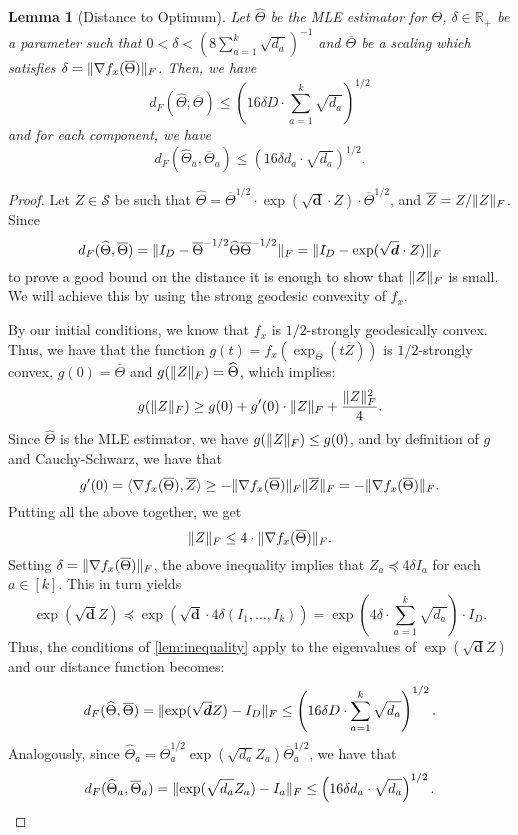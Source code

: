 \documentclass[aos]{imsart}
\newtheorem{lemma}[theorem]{Lemma}
\theoremstyle{definition}
\DeclarePairedDelimiter{\norm}{\lVert}{\rVert}
\newcommand{\R}{{\mathbb{R}}}
\newcommand{\otheta}{\overline{\Theta}}
\newcommand{\htheta}{\widehat{\Theta}}
\newcommand{\oZ}{\overline{Z}}
\renewcommand{\vec}{\bm}
\newcommand{\Sym}{\mathcal{S}}
\begin{document}
\begin{lemma}[Distance to Optimum]\label{lem:tensor-distance-opt}
	Let $\htheta$ be the MLE estimator for $\Theta$, $\delta \in \R_+$ be a parameter such that
	$0 < \delta < \left(8 \sum_{a=1}^k \sqrt{d_a} \right)^{-1}$ and $\otheta$ be a scaling which satisfies $\delta = \norm{\nabla f_x(\otheta)}_F$. Then, we have
	$$ d_F(\htheta; \otheta) \leq \left( 16 \delta D \cdot \sum_{a=1}^k \sqrt{d_a} \right)^{1/2} $$
	and for each component, we have
	$$ d_F(\htheta_a, \otheta_a) \leq \left( 16 \delta d_a \cdot \sqrt{d_a} \right)^{1/2}. $$
\end{lemma}

\begin{proof}
	Let $Z \in \Sym$ be such that $\htheta = \otheta^{1/2} \cdot \exp(\sqrt{\vec d} \cdot Z) \cdot \otheta^{1/2}$, and $\oZ = Z / \norm{Z}_F$.
	Since
	$$ d_F(\htheta, \otheta) = \norm{I_D - \otheta^{-1/2} \htheta \otheta^{-1/2}}_F = \norm{I_D - \exp(\sqrt{\vec d} \cdot Z)}_F $$
	to prove a good bound on the distance it is enough to show that $\norm{Z}_F$ is small.
	We will achieve this by using the strong geodesic convexity of $f_x$.

	By our initial conditions, we know that $f_x$ is $1/2$-strongly geodesically convex.
	Thus, we have that the function $g(t) = f_x(\exp_{\otheta} (t \oZ) )$ is $1/2$-strongly convex, $g(0) = \otheta$ and $g(\norm{Z}_F) = \htheta$, which implies:
	$$ g(\norm{Z}_F) \geq g(0) + g'(0) \cdot \norm{Z}_F + \frac{\norm{Z}_F^2}{4}. $$
	Since $\htheta$ is the MLE estimator, we have $g(\norm{Z}_F) \leq g(0)$, and by definition of
	$g$ and Cauchy-Schwarz, we have that
	$$ g'(0) = \langle \nabla f_x(\otheta), \oZ \rangle \geq - \norm{\nabla f_x(\otheta)}_F \norm{\oZ}_F = - \norm{\nabla f_x(\otheta)}_F. $$
	Putting all the above together, we get
	$$ \norm{Z}_F \leq 4 \cdot \norm{\nabla f_x(\otheta)}_F. $$
	Setting $\delta = \norm{\nabla f_x(\otheta)}_F$, the above inequality implies that $Z_a \preceq 4 \delta I_a$ for each $a \in [k]$. This in turn yields
	$$ \exp(\sqrt{\vec d} Z) \preceq \exp(\sqrt{\vec d} \cdot 4\delta (I_1, \dots, I_k)) =
	\exp\left(4 \delta \cdot \sum_{a=1}^k \sqrt{d_a} \right) \cdot I_D. $$
	Thus, the conditions of \cref{lem:inequality} apply to the eigenvalues of $\exp(\sqrt{\vec d} Z)$ and our distance function becomes:
	$$ d_F(\htheta, \otheta) =  \norm{\exp(\sqrt{\vec d} Z) - I_D}_F \leq \left( 16 \delta D \cdot \sum_{a=1}^k \sqrt{d_a} \right)^{1/2}. $$
	Analogously, since $\htheta_a = \otheta^{1/2}_a \exp(\sqrt{d_a} Z_a) \otheta^{1/2}_a$, we have that
	$$ d_F(\htheta_a, \otheta_a) =  \norm{\exp(\sqrt{d_a} Z_a) - I_a}_F \leq \left( 16 \delta d_a \cdot \sqrt{d_a} \right)^{1/2}. $$
\end{proof}
\end{document}
